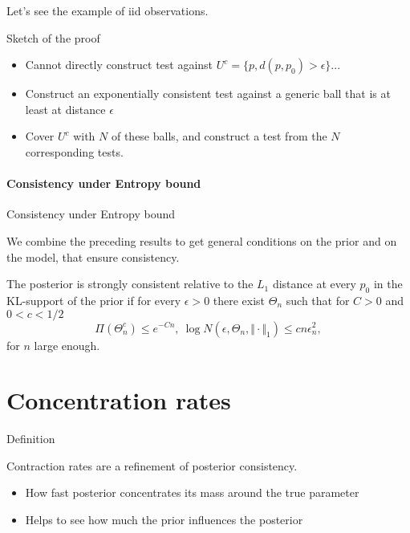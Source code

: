 Let's see the example of iid observations. 







{Sketch of the proof}

\begin{itemize}
\item Cannot directly construct test against $U^c = \{p, d(p,p_0) > \epsilon \}$... 
\item Construct an exponentially consistent test against a generic ball that is at least at distance $\epsilon$
\item Cover $U^c$ with $N$ of these balls, and construct a test from the $N$ corresponding tests.
\end{itemize}






\paragraph{Consistency under Entropy bound}



{Consistency under Entropy bound}

We combine the preceding results to get general conditions \alert<2->{on the prior} and \alert<2->{on the model}, that ensure consistency. 

	\begin{theorem}
	The posterior is strongly consistent relative to the $L_1$ distance at every $p_0$ in the KL-support of the prior if for every $\epsilon>0$ there exist $\Theta_n$ such that for $C>0$ and $0<c < 1/2$
	$$
\Pi(\Theta_n^c) \leq e^{-Cn},~ \log N(\epsilon,\Theta_n,\Vert\cdot\Vert_1) \leq c n \epsilon_n^2,
	$$
	for $n$ large enough. 
	\end{theorem}




\section{Concentration rates}



{Definition}

Contraction rates are a refinement of posterior consistency.  
\begin{itemize}
\item How fast posterior concentrates its mass around the true parameter
\item Helps to see how much the prior influences the posterior
\end{itemize}
 

